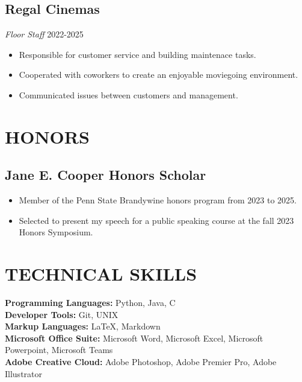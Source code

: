 \documentclass{article}
\begin{document}
\subsection{Regal Cinemas}
\emph{Floor Staff} \hfill 2022-2025
\begin{itemize}
  \setlength\itemsep{0in}
  \item Responsible for customer service and building maintenace tasks.
  \item Cooperated with coworkers to create an enjoyable moviegoing environment.
  \item Communicated issues between customers and management.
\end{itemize}

\section{HONORS}
\subsection{Jane E. Cooper Honors Scholar}
\begin{itemize}
  \setlength\itemsep{0in}
  \item Member of the Penn State Brandywine honors program from 2023 to 2025.
  \item Selected to present my speech for a public speaking course at the fall 2023 Honors Symposium.
\end{itemize}

\section{TECHNICAL SKILLS} 
\begin{multicols*}{2}
\textbf{Programming Languages:} Python, Java, C \\
\textbf{Developer Tools:} Git, UNIX \\
\textbf{Markup Languages:} \LaTeX , Markdown \\

\columnbreak
\textbf{Microsoft Office Suite:} Microsoft Word, Microsoft Excel, Microsoft Powerpoint, Microsoft Teams \\
\textbf{Adobe Creative Cloud:} Adobe Photoshop, Adobe Premier Pro, Adobe Illustrator
\end{multicols*}
\end{document}
